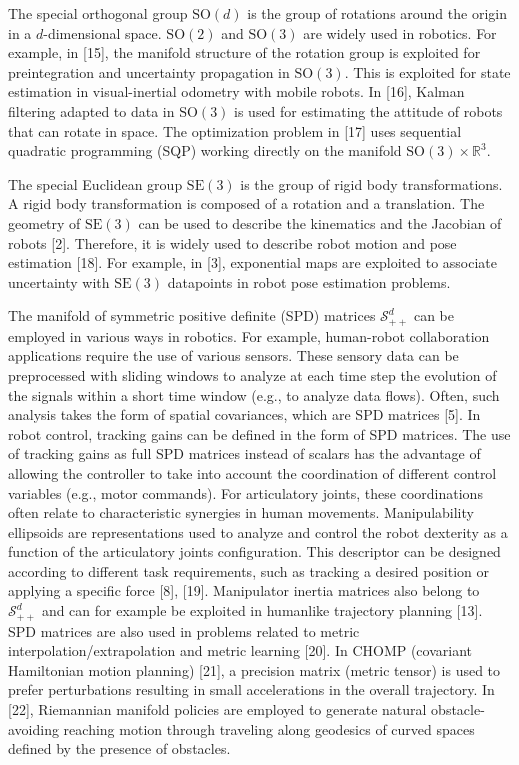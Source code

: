 \documentclass[10pt]{article}
\begin{document}
The special orthogonal group $\mathrm{SO}(d)$ is the group of rotations around the origin in a $d$-dimensional space. $\mathrm{SO}(2)$ and $\mathrm{SO}(3)$ are widely used in robotics. For example, in [15], the manifold structure of the rotation group is exploited for preintegration and uncertainty propagation in $\mathrm{SO}(3)$. This is exploited for state estimation in visual-inertial odometry with mobile robots. In [16], Kalman filtering adapted to data in $\mathrm{SO}(3)$ is used for estimating the attitude of robots that can rotate in space. The optimization problem in [17] uses sequential quadratic programming (SQP) working directly on the manifold $\mathrm{SO}(3) \times \mathbb{R}^{3}$.

The special Euclidean group $\mathrm{SE}(3)$ is the group of rigid body transformations. A rigid body transformation is composed of a rotation and a translation. The geometry of $\mathrm{SE}(3)$ can be used to describe the kinematics and the Jacobian of robots [2]. Therefore, it is widely used to describe robot motion and pose estimation [18]. For example, in [3], exponential maps are exploited to associate uncertainty with $\mathrm{SE}(3)$ datapoints in robot pose estimation problems.

The manifold of symmetric positive definite (SPD) matrices $\mathcal{S}_{++}^{d}$ can be employed in various ways in robotics. For example, human-robot collaboration applications require the use of various sensors. These sensory data can be preprocessed with sliding windows to analyze at each time step the evolution of the signals within a short time window (e.g., to analyze data flows). Often, such analysis takes the form of spatial covariances, which are SPD matrices [5]. In robot control, tracking gains can be defined in the form of SPD matrices. The use of tracking gains as full SPD matrices instead of scalars has the advantage of allowing the controller to take into account the coordination of different control variables (e.g., motor commands). For articulatory joints, these coordinations often relate to characteristic synergies in human movements. Manipulability ellipsoids are representations used to analyze and control the robot dexterity as a function of the articulatory joints configuration. This descriptor can be designed according to different task requirements, such as tracking a desired position or applying a specific force [8], [19]. Manipulator inertia matrices also belong to $\mathcal{S}_{++}^{d}$ and can for example be exploited in humanlike trajectory planning [13]. SPD matrices are also used in problems related to metric interpolation/extrapolation and metric learning [20]. In CHOMP (covariant Hamiltonian motion planning) [21], a precision matrix (metric tensor) is used to prefer perturbations resulting in small accelerations in the overall trajectory. In [22], Riemannian manifold policies are employed to generate natural obstacle-avoiding reaching motion through traveling along geodesics of curved spaces defined by the presence of obstacles.
\end{document}
